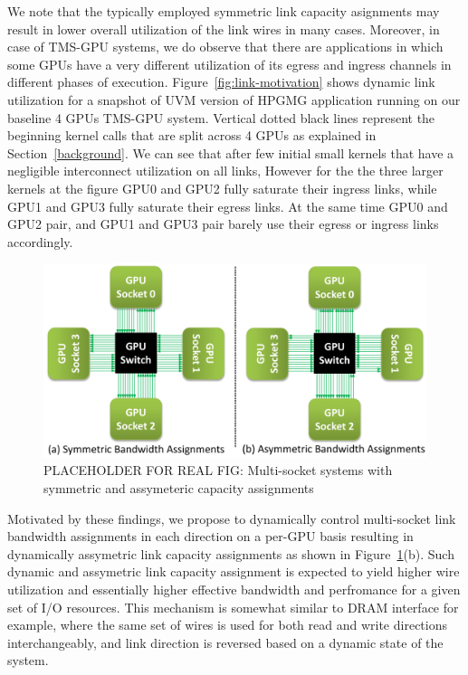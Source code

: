 We note that the typically employed symmetric link
capacity asignments may result in lower overall utilization of the link wires
in many cases. Moreover, in case of TMS-GPU systems, we do observe that there
are applications in which some GPUs have a very different utilization of its
egress and ingress channels in different phases of execution.
Figure~\ref{fig:link-motivation} shows dynamic link utilization for a snapshot
of UVM version of HPGMG application running on our baseline 4 GPUs TMS-GPU
system. Vertical dotted black lines represent the beginning kernel calls that
are split across 4 GPUs as explained in Section~\ref{background}. We can see
that after few initial small kernels that have a negligible interconnect
utilization on all links, However for the the three larger kernels at the
figure GPU0 and GPU2 fully saturate their ingress links, while GPU1 and GPU3
fully saturate their egress links. At the same time GPU0 and GPU2 pair,
and GPU1 and GPU3 pair barely use their egress or ingress links accordingly.

\begin{figure}[t]
    \centering
    \includegraphics[width=1.0\columnwidth]{figures/tms_links.pdf}
    \caption{PLACEHOLDER FOR REAL FIG: Multi-socket systems with symmetric and
    assymeteric capacity assignments}
    \label{fig:symmetric_assymetric}
\end{figure}



Motivated by these findings, we propose to dynamically control multi-socket
link bandwidth assignments in each direction on a per-GPU basis resulting in
dynamically assymetric link capacity assignments as shown in
Figure~\ref{fig:symmetric_assymetric}(b). Such dynamic and assymetric link
capacity assignment is expected to yield higher wire utilization and
essentially higher effective bandwidth and perfromance for a given set of I/O
resources. This mechanism is somewhat similar to DRAM interface for example,
where the same set of wires is used for both read and write directions
interchangeably, and link direction is reversed based on a dynamic state of the
system. 

